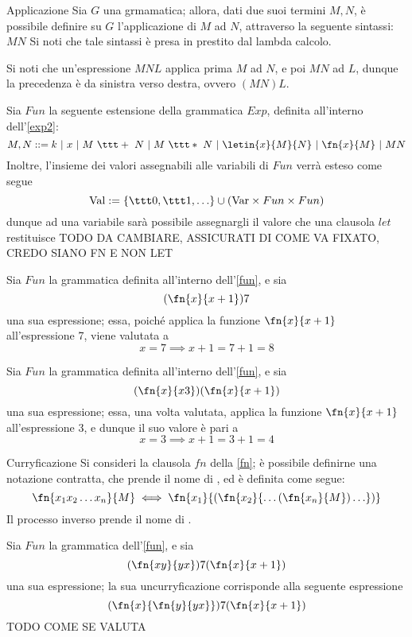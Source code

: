 \documentclass[a4paper, 12pt]{report}
\begin{document}
    \begin{frameddefn}{Applicazione}
        Sia $G$ una grmamatica; allora, dati due suoi termini $M,N$, è possibile definire su $G$ l'applicazione di $M$ ad $N$, attraverso la seguente sintassi: $MN$ Si noti che tale sintassi è presa in prestito dal lambda calcolo.

        Si noti che un'espressione $MNL$ applica prima $M$ ad $N$, e poi $MN$ ad $L$, dunque la precedenza è da sinistra verso destra, ovvero $(MN)L$.
    \end{frameddefn}

    \begin{example}
        \label{fun}
        Sia $Fun$ la seguente estensione della grammatica $Exp$, definita all'interno dell'\cref{exp2}: $$M,N ::= k \ | \ x \ | \ M \ \ttt + \ N \ | \ M \ \ttt * \ N \ | \ \letin{x}{M}{N} \ | \ \fn{x}{M} \ | \ MN$$ Inoltre, l'insieme dei valori assegnabili alle variabili di $Fun$ verrà esteso come segue $$\mathrm{Val} := \{\ttt 0, \ttt 1, \ldots \} \cup (\mathrm{Var} \times Fun \times Fun)$$ dunque ad una variabile sarà possibile assegnargli il valore che una clausola $let$ restituisce TODO DA CAMBIARE, ASSICURATI DI COME VA FIXATO, CREDO SIANO FN E NON LET
    \end{example}

    \begin{example}
        Sia $Fun$ la grammatica definita all'interno dell'\cref{fun}, e sia $$(\fn{x}{x +1})7$$ una sua espressione; essa, poiché applica la funzione $\fn{x}{x+1}$ all'espressione 7, viene valutata a $$x = 7 \implies x + 1= 7 + 1 = 8$$
    \end{example}

    \begin{example}
        Sia $Fun$ la grammatica definita all'interno dell'\cref{fun}, e sia $$(\fn{x}{x3})(\fn{x}{x+1})$$ una sua espressione; essa, una volta valutata, applica la funzione $\fn{x}{x+1}$ all'espressione 3, e dunque il suo valore è pari a $$x = 3 \implies x + 1 = 3 + 1 = 4$$
    \end{example}

    \begin{framedobs}{Curryficazione}
        Si consideri la clausola $fn$ della \cref{fn}; è possibile definirne una notazione contratta, che prende il nome di , ed è definita come segue: $$\fn{x_1x_2 \ldots x_n}{M} \iff \fn{x_1}{(\fn{x_2}{\ldots (\fn{x_n}{M}) \ldots})}$$ Il processo inverso prende il nome di .
    \end{framedobs}

    \begin{example}[Curryficazioni]
        Sia $Fun$ la grammatica dell'\cref{fun}, e sia $$(\fn{xy}{yx})7(\fn{x}{x+1})$$ una sua espressione; la sua uncurryficazione corrisponde alla seguente espressione $$(\fn{x}{\fn{y}{yx}})7(\fn{x}{x+1})$$ TODO COME SE VALUTA
    \end{example}
\end{document}
